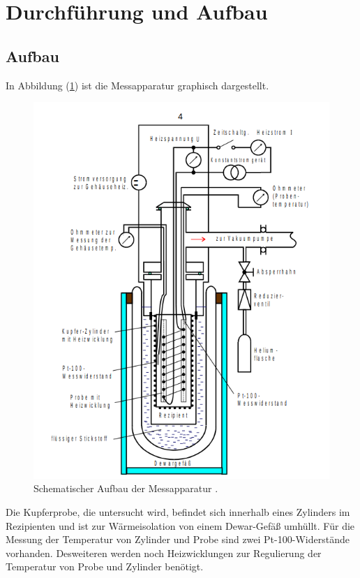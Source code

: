 \section{Durchführung und Aufbau}
\label{Aufbau}
\subsection{Aufbau}
In Abbildung (\ref{fig:aufbau1}) ist die Messapparatur graphisch dargestellt.
\begin{figure}
	\centering
	\includegraphics[scale=0.5]{fig/aufbau.png}
	\caption{Schematischer Aufbau der Messapparatur \cite[4]{Anleitung}.}
	\label{fig:aufbau1}
\end{figure}
\FloatBarrier
\noindent Die Kupferprobe, die untersucht wird, befindet sich innerhalb eines Zylinders im Rezipienten und ist zur Wärmeisolation von einem Dewar-Gefäß umhüllt.
Für die Messung der Temperatur von Zylinder und Probe sind zwei Pt-100-Widerstände vorhanden. Desweiteren werden noch Heizwicklungen zur Regulierung der Temperatur von Probe und Zylinder benötigt.
